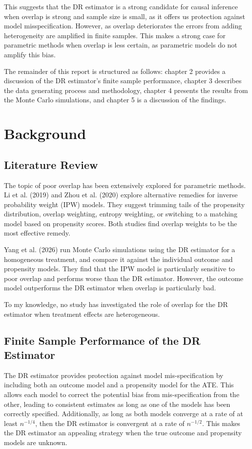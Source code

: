 \documentclass[12pt, oneside]{article}   	%
\begin{document}
This suggests that the DR estimator is a strong candidate for causal inference when overlap is strong and sample size is small, as it offers us protection against model misspecification. However, as overlap deteriorates the errors from adding heterogeneity are amplified in finite samples. This makes a strong case for parametric methods when overlap is less certain, as parametric models do not amplify this bias.

The remainder of this report is structured as follows: chapter 2 provides a discussion of the DR estimator’s finite sample performance, chapter 3 describes the data generating process and methodology, chapter 4 presents the results from the Monte Carlo simulations, and chapter 5 is a discussion of the findings.

\section{Background}

\subsection{Literature Review}

The topic of poor overlap has been extensively explored for parametric methods. Li et al. (2019) and Zhou et al. (2020) explore alternative remedies for inverse probability weight (IPW) models. They suggest trimming tails of the propensity distribution, overlap weighting, entropy weighting, or switching to a matching model based on propensity scores. Both studies find overlap weights to be the most effective remedy.

Yang et al. (2026) run Monte Carlo simulations using the DR estimator for a homogeneous treatment, and compare it against the individual outcome and propensity models. They find that the IPW model is particularly sensitive to poor overlap and performs worse than the DR estimator. However, the outcome model outperforms the DR estimator when overlap is particularly bad.

To my knowledge, no study has investigated the role of overlap for the DR estimator when treatment effects are heterogeneous.

\subsection{Finite Sample Performance of the DR Estimator}

The DR estimator provides protection against model mis-specification by including both an outcome model and a propensity model for the ATE. This allows each model to correct the potential bias from mis-specification from the other, leading to consistent estimates as long as one of the models has been correctly specified. Additionally, as long as both models converge at a rate of at least $n^{-1/4}$, then the DR estimator is convergent at a rate of $n^{-1/2}$. This makes the DR estimator an appealing strategy when the true outcome and propensity models are unknown.
\end{document}
